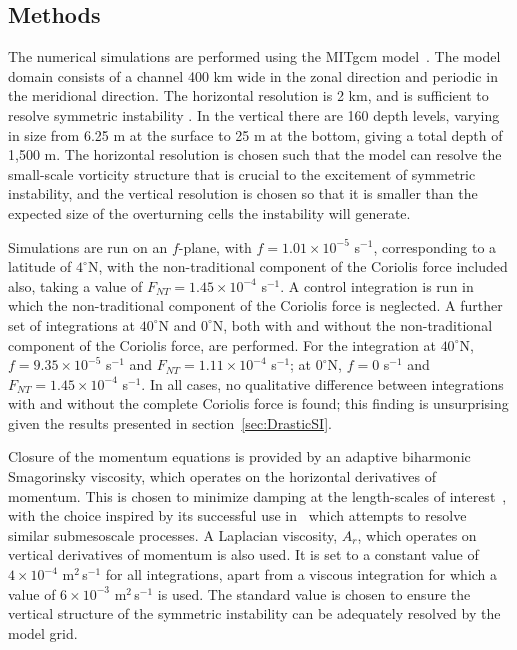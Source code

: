 \subsection{Methods}
\label{subsec:2DMethods}
The numerical simulations are performed using the MITgcm model~\citep{Marshall1997}. The model domain consists of a channel 400 km wide in the zonal direction and periodic in the meridional direction. The horizontal resolution is 2 km, and is sufficient to resolve symmetric instability \citep[e.g.][]{Bachman2014, Brannigan2017}. In the vertical there are 160 depth levels, varying in size from 6.25 m at the surface to 25 m at the bottom, giving a total depth of 1,500 m. The horizontal resolution is chosen such that the model can resolve the small-scale vorticity structure that is crucial to the excitement of symmetric instability, and the vertical resolution is chosen so that it is smaller than the expected size of the overturning cells the instability will generate.

Simulations are run on an $f$-plane, with $f = 1.01 \times 10 ^{-5}$ s$^{-1}$, corresponding to a latitude of $4^\circ$N, with the non-traditional component of the Coriolis force included also, taking a value of $F_{NT} = 1.45 \times 10^{-4}$ s$^{-1}$. A control integration is run in which the non-traditional component of the Coriolis force is neglected. A further set of integrations at $40^\circ$N and $0^\circ$N, both with and without the non-traditional component of the Coriolis force, are performed. For the integration at $40^\circ$N, $f = 9.35 \times 10^{-5} $ s$^{-1}$ and $F_{NT} = 1.11 \times 10^{-4}$ s$^{-1}$; at $0^\circ$N, $f = 0$ s$^{-1}$ and $F_{NT} = 1.45 \times 10^{-4}$ s$^{-1}$. In all cases, no qualitative difference between integrations with and without the complete Coriolis force is found; this finding is unsurprising given the results presented in section~\ref{sec:DrasticSI}.

Closure of the momentum equations is provided by an adaptive biharmonic Smagorinsky viscosity, which operates on the horizontal derivatives of momentum. This is chosen to minimize damping at the length-scales of interest~\citep{Smagorinsky1963, Griffies2000}, with the choice inspired by its successful use in~\citet{Brannigan2016} which attempts to resolve similar submesoscale processes. A Laplacian viscosity, $A_r$, which operates on vertical derivatives of momentum is also used. It is set to a constant value of $4 \times 10^{-4}$ m$^2$\,s$^{-1}$ for all integrations, apart from a viscous integration for which a value of $6 \times 10^{-3}$ m$^2$\,s$^{-1}$ is used. The standard value is chosen to ensure the vertical structure of the symmetric instability can be adequately resolved by the model grid.

